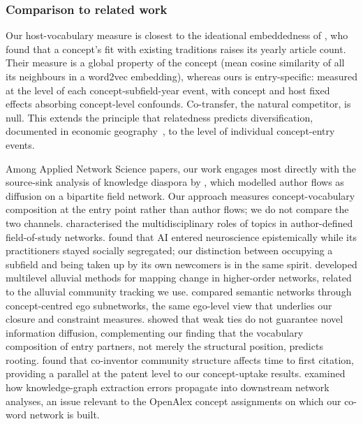 \documentclass[11pt,letterpaper]{article}
\begin{document}
\subsubsection{Comparison to related work}
\label{sec:rq2_comparison}

Our host-vocabulary measure is closest to the ideational embeddedness of \citet{Cheng2023}, who found that a
concept's fit with existing traditions raises its yearly article count. Their measure is a global property of
the concept (mean cosine similarity of all its neighbours in a word2vec embedding), whereas ours is
entry-specific: measured at the level of each concept-subfield-year event, with concept and host fixed effects
absorbing concept-level confounds. Co-transfer, the natural competitor, is null. This extends the principle
that relatedness predicts diversification, documented in economic
geography~\citep{Boschma2014, Hidalgo2018}, to the level of individual concept-entry events.

Among Applied Network Science papers, our work engages most directly with the source-sink analysis of
knowledge diaspora by \citet{Domenico2016}, which modelled author flows as diffusion on a bipartite field
network. Our approach measures concept-vocabulary composition at the entry point rather than author flows; we do
not compare the two channels. \citet{Cunningham2022} characterised the multidisciplinary roles of topics in
author-defined field-of-study networks. \citet{Fontaine2024} found that AI entered neuroscience epistemically
while its practitioners stayed socially segregated; our distinction between occupying a subfield and being
taken up by its own newcomers is in the same spirit. \citet{Holmgren2023} developed multilevel alluvial methods for mapping
change in higher-order networks, related to the alluvial community tracking we use. \citet{Medeuov2021}
compared semantic networks through concept-centred ego subnetworks, the same ego-level view that underlies our
closure and constraint measures.
\citet{Larson2017} showed that weak ties do not guarantee novel information diffusion, complementing our
finding that the vocabulary composition of entry partners, not merely the structural position, predicts rooting.
\citet{Doonan2019} found that co-inventor community structure affects time to first citation, providing
a parallel at the patent level to our concept-uptake results. \citet{Cai2025} examined how knowledge-graph
extraction errors propagate into downstream network analyses, an issue relevant to the OpenAlex concept
assignments on which our co-word network is built.
\end{document}
